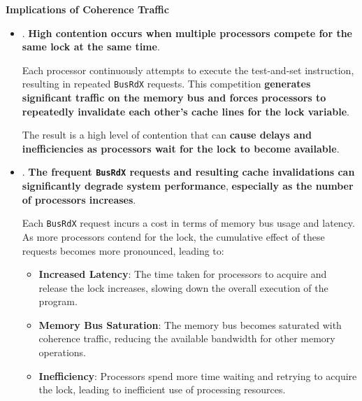 \highspace
\begin{flushleft}
    \textcolor{Green3}{ \textbf{Implications of Coherence Traffic}}
\end{flushleft}
\begin{itemize}
    \item {}. \textbf{High contention occurs when multiple processors compete for the same lock at the same time}.
    
    Each processor continuously attempts to execute the test-and-set instruction, resulting in repeated \texttt{BusRdX} requests. This competition \textbf{generates significant traffic on the memory bus and forces processors to repeatedly invalidate each other's cache lines for the lock variable}.
    
    The result is a high level of contention that can \textbf{cause delays and inefficiencies as processors wait for the lock to become available}.


    \item {}. \textbf{The frequent \texttt{BusRdX} requests and resulting cache invalidations can significantly degrade system performance}, \textbf{especially as the number of processors increases}.
    
    Each \texttt{BusRdX} request incurs a cost in terms of memory bus usage and latency. As more processors contend for the lock, the cumulative effect of these requests becomes more pronounced, leading to:
    \begin{itemize}
        \item[\textcolor{Red2}{\faIcon{times}}] \textcolor{Red2}{\textbf{Increased Latency}}: The time taken for processors to acquire and release the lock increases, slowing down the overall execution of the program.
        
        \item[\textcolor{Red2}{\faIcon{times}}] \textcolor{Red2}{\textbf{Memory Bus Saturation}}: The memory bus becomes saturated with coherence traffic, reducing the available bandwidth for other memory operations.
        
        \item[\textcolor{Red2}{\faIcon{times}}] \textcolor{Red2}{\textbf{Inefficiency}}: Processors spend more time waiting and retrying to acquire the lock, leading to inefficient use of processing resources.
    \end{itemize}
\end{itemize}

